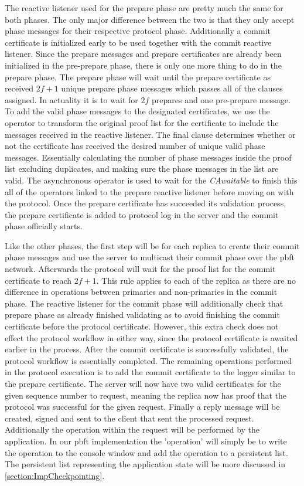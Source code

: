 The reactive listener used for the prepare phase are pretty much the same for both phases. The only major difference between the two is that they only accept phase messages for their respective protocol phase. Additionally a commit certificate is initialized early to be used together with the commit reactive listener. Since the prepare messages and prepare certificates are already been initialized in the pre-prepare phase, there is only one more thing to do in the prepare phase. The prepare phase will wait until the prepare certificate as received $2f+1$ unique prepare phase messages which passes all of the  clauses assigned. In actuality it is to wait for $2f$ prepares and one pre-prepare message. To add the valid phase messages to the designated certificates, we use the  operator to transform the original proof list for the certificate to include the messages received in the reactive listener. The final  clause determines whether or not the certificate has received the desired number of unique valid phase messages. Essentially calculating the number of phase messages inside the proof list excluding duplicates, and making sure the phase messages in the list are valid. The asynchronous  operator is used to wait for the \emph{CAwaitable} to finish this all of the operators linked to the prepare reactive listener before moving on with the protocol. Once the prepare certificate has succeeded its validation process, the prepare certificate is added to protocol log in the server and the commit phase officially starts. 

Like the other phases, the first step will be for each replica to create their commit phase messages and use the server to multicast their commit phase over the \ac{pbft} network. Afterwards the protocol will wait for the proof list for the commit certificate to reach $2f+1$. This rule applies to each of the replica as there are no difference in operations between primaries and non-primaries in the commit phase. The reactive listener for the commit phase will additionally check that prepare phase as already finished validating as to avoid finishing the commit certificate before the protocol certificate. However, this extra check does not effect the protocol workflow in either way, since the protocol certificate is awaited earlier in the process. After the commit certificate is successfully validated, the protocol workflow is essentially completed. The remaining operations performed in the protocol execution is to add the commit certificate to the logger similar to the prepare certificate. The server will now have two valid certificates for the given sequence number to request, meaning the replica now has proof that the protocol was successful for the given request. Finally a reply message will be created, signed and sent to the client that sent the processed request. Additionally the operation within the request will be performed by the application. In our \ac{pbft} implementation the 'operation' will simply be to write the operation to the console window and add the operation to a persistent list. The persistent list representing the application state will be more discussed in \autoref{section:ImpCheckpointing}.
\fi

